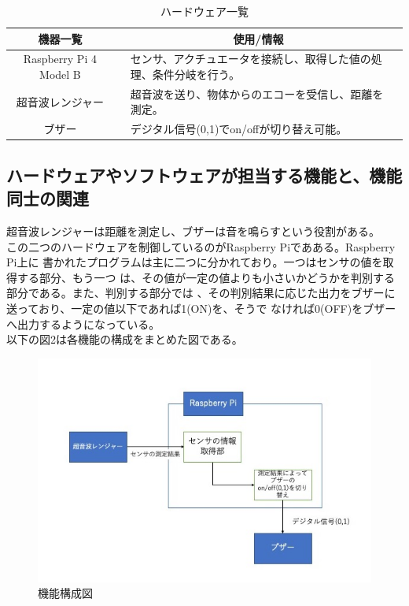 \documentclass[dvipdfmx,autodetect-engine,titlepage]{jsarticle}
\begin{document}
 \begin{table}[h]
  \centering
  \caption{ハードウェア一覧}
  \begin{tabular}{clll}
  \hline
  機器一覧            &  & \multicolumn{1}{c}{使用/情報}                  &  \\ \hline
  Raspberry Pi 4 Model B       &  & センサ、アクチュエータを接続し、取得した値の処理、条件分岐を行う。  &  \\ \hline
  超音波レンジャー      &  & 超音波を送り、物体からのエコーを受信し、距離を測定。 &  \\ \hline
  ブザー              &  & デジタル信号(0,1)でon/offが切り替え可能。                             &  \\ \hline
  \end{tabular}
  \end{table}
 
 \subsection{ハードウェアやソフトウェアが担当する機能と、機能同士の関連}
 超音波レンジャーは距離を測定し、ブザーは音を鳴らすという役割がある。\\
 この二つのハードウェアを制御しているのがRaspberry Piであある。Raspberry Pi上に
 書かれたプログラムは主に二つに分かれており。一つはセンサの値を取得する部分、もう一つ
 は、その値が一定の値よりも小さいかどうかを判別する部分である。また、判別する部分では
 、その判別結果に応じた出力をブザーに送っており、一定の値以下であれば1(ON)を、そうで
 なければ0(OFF)をブザーへ出力するようになっている。\\
 以下の図2は各機能の構成をまとめた図である。

 \begin{figure}[h]
  \centering
  \includegraphics[scale=0.4]{pic2.jpg}
  \caption{機能構成図}
\end{figure}
 
\end{document}

